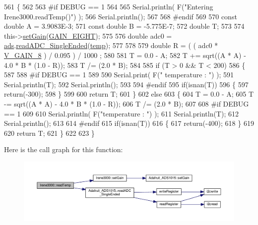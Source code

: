 \begin{DoxyCode}
561 \{
562 
563 \textcolor{preprocessor}{#if DEBUG == 1 }
564 
565     Serial.println( F(\textcolor{stringliteral}{"Entering Irene3000.readTemp()"}) );
566     Serial.println();
567 
568 \textcolor{preprocessor}{#endif}
569 
570     \textcolor{keyword}{const} \textcolor{keywordtype}{double} A = 3.9083E-3;
571     \textcolor{keyword}{const} \textcolor{keywordtype}{double} B = -5.775E-7;
572     \textcolor{keywordtype}{double} T;
573 
574     this->\hyperlink{class_irene3000_aff7c5da186b388e7272e63ff88a20c34}{setGain}(\hyperlink{_cool_adafruit___a_d_s1015_8h_a3d6c0e15829a207b9155890811fa4781af284da818fc21db27c5ffcfaff7047cb}{GAIN\_EIGHT});
575 
576     \textcolor{keywordtype}{double} adc0 = \hyperlink{class_irene3000_a1215e77ba761c9908d80d691f149e135}{ads}.\hyperlink{class_adafruit___a_d_s1015_a40f38b9e1f3ec397c0670dd632510235}{readADC\_SingleEnded}(\hyperlink{_irene3000_8h_a5905d48604152cf57aa6bfa087b49173}{temp});
577 
578 
579     \textcolor{keywordtype}{double} R = ( ( adc0 * \hyperlink{_irene3000_8h_ab7ab16df599d3f0ce29e12791a504891}{V\_GAIN\_8} ) / 0.095 ) / 1000 ;
580 
581     T = 0.0 - A;
582     T += sqrt((A * A) - 4.0 * B * (1.0 - R));
583     T /= (2.0 * B);
584 
585     \textcolor{keywordflow}{if} (T > 0 && T < 200) 
586     \{
587 
588 \textcolor{preprocessor}{    #if DEBUG == 1 }
589 
590         Serial.print( F(\textcolor{stringliteral}{" temperature : "}) );
591         Serial.println(T);
592         Serial.println();
593     
594 \textcolor{preprocessor}{    #endif }
595         \textcolor{keywordflow}{if}(isnan(T))
596         \{
597             \textcolor{keywordflow}{return}(-300);           
598         \}
599 
600         \textcolor{keywordflow}{return} T;
601     \}
602     \textcolor{keywordflow}{else} 
603     \{
604         T = 0.0 - A;
605         T -= sqrt((A * A) - 4.0 * B * (1.0 - R));
606         T /= (2.0 * B);
607     
608 \textcolor{preprocessor}{    #if DEBUG == 1 }
609     
610         Serial.println( F(\textcolor{stringliteral}{"temperature : "}) );
611         Serial.println(T);
612         Serial.println();
613     
614 \textcolor{preprocessor}{    #endif}
615         \textcolor{keywordflow}{if}(isnan(T))
616         \{
617             \textcolor{keywordflow}{return}(-400);           
618         \}
619 
620         \textcolor{keywordflow}{return} T;
621     \}
622 
623 \}
\end{DoxyCode}
Here is the call graph for this function\+:\nopagebreak
\begin{figure}[H]
\begin{center}
\leavevmode
\includegraphics[width=350pt]{d6/d03/class_irene3000_a80bc6dfea106dc3bc54fa20204d4d5dc_cgraph}
\end{center}
\end{figure}
